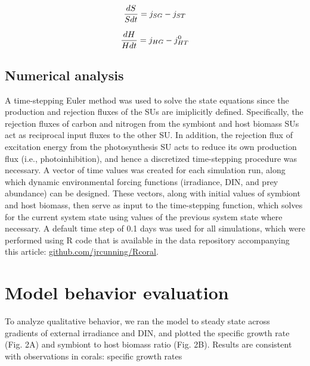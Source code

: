 \documentclass[]{elsarticle} %
\begin{document}
\begin{equation} {dS \over Sdt} = j_{SG} - j_{ST} \end{equation}

\begin{equation} {dH \over Hdt} = j_{HG} - j_{HT}^0 \end{equation}

\subsection{Numerical analysis}\label{numerical-analysis}

A time-stepping Euler method was used to solve the state equations since
the production and rejection fluxes of the SUs are imiplicitly defined.
Specifically, the rejection fluxes of carbon and nitrogen from the
symbiont and host biomass SUs act as reciprocal input fluxes to the
other SU. In addition, the rejection flux of excitation energy from the
photosynthesis SU acts to reduce its own production flux (i.e.,
photoinhibition), and hence a discretized time-stepping procedure was
necessary. A vector of time values was created for each simulation run,
along which dynamic environmental forcing functions (irradiance, DIN,
and prey abundance) can be designed. These vectors, along with initial
values of symbiont and host biomass, then serve as input to the
time-stepping function, which solves for the current system state using
values of the previous system state where necessary. A default time step
of 0.1 days was used for all simulations, which were performed using R
code that is available in the data repository accompanying this article:
\url{github.com/jrcunning/Rcoral}.

\section{Model behavior evaluation}\label{model-behavior-evaluation}

To analyze qualitative behavior, we ran the model to steady state across
gradients of external irradiance and DIN, and plotted the specific
growth rate (Fig. 2A) and symbiont to host biomass ratio (Fig. 2B).
Results are consistent with observations in corals: specific growth
rates
\end{document}
